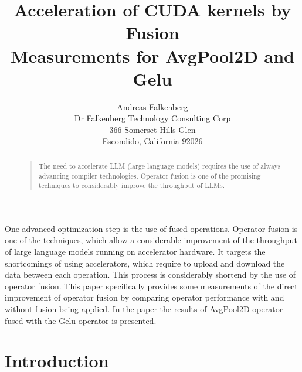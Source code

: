 \documentclass[letterpaper]{article}
\begin{document}
\title{Acceleration of CUDA kernels by Fusion \\ Measurements for AvgPool2D and Gelu}
\author{Andreas Falkenberg\\
Dr Falkenberg Technology Consulting Corp\\
366 Somerset Hills Glen\\
Escondido, California 92026\\
}

\maketitle

\begin{abstract}
\begin{quote}
The need to accelerate LLM (large language models) requires the use of always advancing compiler technologies. Operator fusion is one of the promising techniques to considerably improve the throughput of LLMs.

\end{quote}
\end{abstract}

\noindent

One advanced optimization step is the use of fused operations. Operator fusion is one of the techniques, which allow a considerable improvement of the throughput of large language models running on accelerator hardware. It targets the shortcomings of using accelerators, which require to upload and download the data between each operation. This process is considerably shortend by the use of operator fusion. This paper specifically provides some measurements of the direct improvement of operator fusion by comparing operator performance with and without fusion being applied. In the paper the results of AvgPool2D operator fused with the Gelu operator is presented.


\section{Introduction}
\end{document}
